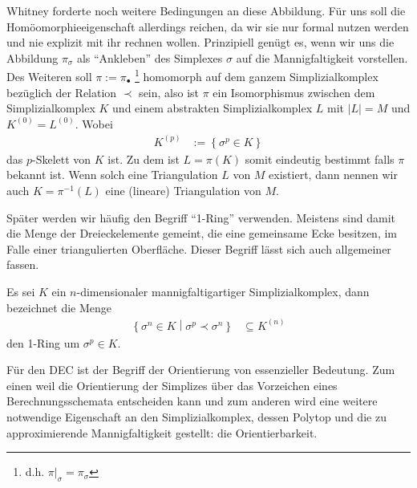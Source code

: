 \begin{bemerkung}
      Whitney \cite{whitney} forderte noch weitere Bedingungen an diese Abbildung. 
      Für uns soll die Homöomorphieeigenschaft allerdings reichen, da wir sie nur formal nutzen werden und nie explizit mit ihr rechnen wollen.
      Prinzipiell genügt es, wenn wir uns die Abbildung \( \pi_{\sigma} \) als "`Ankleben"' des Simplexes \( \sigma \) auf die Mannigfaltigkeit vorstellen.
      Des Weiteren soll \( \pi:=\pi_{\bullet} \) \footnote{d.h. \( \pi|_{\sigma} = \pi_{\sigma} \)} homomorph auf dem ganzem Simplizialkomplex bezüglich der Relation \( \prec \) sein, 
      also ist \( \pi \) ein Isomorphismus zwischen dem Simplizialkomplex \( K \) und einem abstrakten Simplizialkomplex \( L \) mit \( |L| = M \) und \( K^{(0)} = L^{(0)} \).
      Wobei
      \begin{align}
        K^{(p)} &:= \left\{ \sigma^{p} \in K \right\}
      \end{align}
      das \( p \)-Skelett von \( K \) ist. 
      Zu dem ist \( L = \pi(K) \) somit eindeutig bestimmt falls \( \pi \) bekannt ist.
      Wenn solch eine Triangulation \( L \) von \( M \) existiert, dann nennen wir auch \( K = \pi^{-1}(L) \) eine (lineare) Triangulation von \( M \).
    \end{bemerkung}

    Später werden wir häufig den Begriff "`1-Ring"' verwenden.
    Meistens sind damit die Menge der Dreieckelemente gemeint, die eine gemeinsame Ecke besitzen, 
    im Falle einer triangulierten Oberfläche.
    Dieser Begriff lässt sich auch allgemeiner fassen.
    \begin{definition}
      Es sei \( K \) ein \( n \)-dimensionaler mannigfaltigartiger Simplizialkomplex,
      dann bezeichnet die Menge
      \begin{align}
        \left\{ \sigma^{n}\in K \middle| \sigma^{p}\prec\sigma^{n} \right\} & \subseteq K^{(n)}
      \end{align}
      den 1-Ring um \( \sigma^{p}\in K \).
    \end{definition}

    Für den DEC ist der Begriff der Orientierung von essenzieller Bedeutung. 
    Zum einen weil die Orientierung der Simplizes über das Vorzeichen eines Berechnungsschemata entscheiden kann 
    und zum anderen wird eine weitere notwendige Eigenschaft an den Simplizialkomplex, dessen Polytop und die zu 
    approximierende Mannigfaltigkeit gestellt: die Orientierbarkeit.

